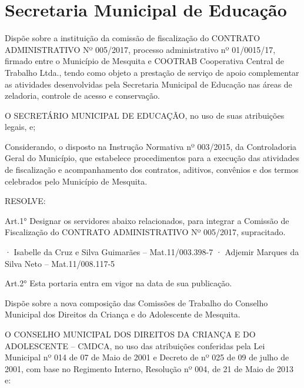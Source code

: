 \documentclass{doliberto}
\begin{document}
\maketitle

\section{Secretaria Municipal de Educação}
 

Dispõe  sobre  a  instituição  da  comissão  de  fiscalização  do 
CONTRATO  ADMINISTRATIVO  Nº  005/2017,  processo 
administrativo  nº  01/0015/17, 
firmado  entre  o 
Município de Mesquita e COOTRAB Cooperativa Central 
de  Trabalho  Ltda.,  tendo  como  objeto  a  prestação  de 
serviço de apoio complementar as atividades desenvolvidas 
pela  Secretaria  Municipal  de  Educação  nas  áreas  de 
zeladoria, controle de acesso e conservação. 
 
O  SECRETÁRIO  MUNICIPAL  DE  EDUCAÇÃO,  no  uso  de
suas atribuições legais, e; 
 
Considerando,  o  disposto  na  Instrução  Normativa  nº 
003/2015,  da  Controladoria  Geral  do  Município,  que 
estabelece  procedimentos  para  a  execução  das  atividades 
de  fiscalização  e  acompanhamento  dos  contratos,  aditivos, 
convênios  e  dos  termos  celebrados  pelo  Município  de 
Mesquita. 
 
RESOLVE: 
 
Art.1°  Designar  os  servidores  abaixo  relacionados,  para 
integrar  a  Comissão  de  Fiscalização  do  CONTRATO 
ADMINISTRATIVO Nº 005/2017, supracitado. 
 
· Isabelle da Cruz e Silva Guimarães – Mat.11/003.398-7 
· Adjemir Marques da Silva Neto – Mat.11/008.117-5 
 
Art.2°  Esta  portaria  entra  em  vigor  na  data  de  sua 
publicação. 
 


\closearticle


Dispõe  sobre  a  nova  composição  das  Comissões  de 
Trabalho  do  Conselho  Municipal  dos  Direitos  da 
Criança e do Adolescente de Mesquita.

O  CONSELHO  MUNICIPAL  DOS  DIREITOS  DA  CRIANÇA  E 
DO  ADOLESCENTE  –  CMDCA,  no  uso  das  atribuições 
conferidas pela Lei Municipal nº 014 de 07 de Maio de 2001 
e  Decreto  de  nº  025  de  09  de  julho  de  2001,  com  base  no 
Regimento  Interno,  Resolução  nº  004,  de  21  de  Maio  de 
2013 e:  
\end{document}
